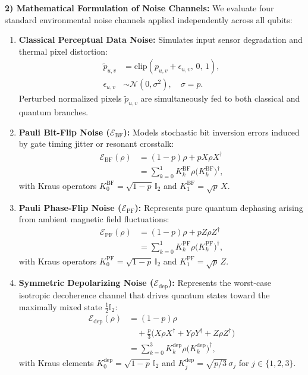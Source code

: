 \documentclass[journal]{IEEEtran}
\begin{document}
\textbf{2) Mathematical Formulation of Noise Channels:}
We evaluate four standard environmental noise channels applied independently across all qubits:
\begin{enumerate}
    \item \textbf{Classical Perceptual Data Noise:} Simulates input sensor degradation and thermal pixel distortion:
    \begin{align}
    \tilde{p}_{u,v} &= \mathrm{clip}\left( p_{u,v} + \epsilon_{u,v}, \, 0, \, 1 \right), \nonumber \\
    \epsilon_{u,v} &\sim \mathcal{N}(0, \sigma^2), \quad \sigma = p.
    \label{eq:data_noise_formulation}
    \end{align}
    Perturbed normalized pixels $\tilde{p}_{u,v}$ are simultaneously fed to both classical and quantum branches.
    \item \textbf{Pauli Bit-Flip Noise ($\mathcal{E}_{\mathrm{BF}}$):} Models stochastic bit inversion errors induced by gate timing jitter or resonant crosstalk:
    \begin{align}
    \mathcal{E}_{\mathrm{BF}}(\rho) &= (1-p)\rho + p X \rho X^\dagger \nonumber \\
    &= \sum_{k=0}^{1} K_k^{\mathrm{BF}} \rho \big(K_k^{\mathrm{BF}}\big)^\dagger,
    \label{eq:bit_flip_formulation}
    \end{align}
    with Kraus operators $K_0^{\mathrm{BF}} = \sqrt{1-p}\,\mathbb{I}_2$ and $K_1^{\mathrm{BF}} = \sqrt{p}\,X$.
    \item \textbf{Pauli Phase-Flip Noise ($\mathcal{E}_{\mathrm{PF}}$):} Represents pure quantum dephasing arising from ambient magnetic field fluctuations:
    \begin{align}
    \mathcal{E}_{\mathrm{PF}}(\rho) &= (1-p)\rho + p Z \rho Z^\dagger \nonumber \\
    &= \sum_{k=0}^{1} K_k^{\mathrm{PF}} \rho \big(K_k^{\mathrm{PF}}\big)^\dagger,
    \label{eq:phase_flip_formulation}
    \end{align}
    with Kraus operators $K_0^{\mathrm{PF}} = \sqrt{1-p}\,\mathbb{I}_2$ and $K_1^{\mathrm{PF}} = \sqrt{p}\,Z$.
    \item \textbf{Symmetric Depolarizing Noise ($\mathcal{E}_{\mathrm{dep}}$):} Represents the worst-case isotropic decoherence channel that drives quantum states toward the maximally mixed state $\frac{1}{2}\mathbb{I}_2$:
    \begin{align}
    \mathcal{E}_{\mathrm{dep}}(\rho) &= (1-p)\rho \nonumber \\
    &\quad + \frac{p}{3} \big( X\rho X^\dagger + Y\rho Y^\dagger + Z\rho Z^\dagger \big) \nonumber \\
    &= \sum_{k=0}^{3} K_k^{\mathrm{dep}} \rho \big(K_k^{\mathrm{dep}}\big)^\dagger,
    \label{eq:depolarizing_formulation}
    \end{align}
    with Kraus elements $K_0^{\mathrm{dep}} = \sqrt{1-p}\,\mathbb{I}_2$ and $K_j^{\mathrm{dep}} = \sqrt{p/3}\,\sigma_j$ for $j \in \{1, 2, 3\}$.
\end{enumerate}
\end{document}
